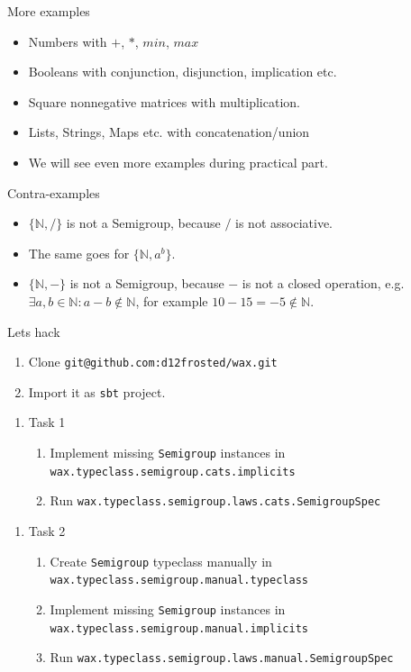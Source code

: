 \documentclass[presentation,aspectratio=169,smaller]{beamer}
\begin{document}
\begin{frame}[label={sec:org49fce23}]{More examples}
\begin{itemize}
\item Numbers with \(+\), \(*\), \(min\), \(max\)
\item Booleans with conjunction, disjunction, implication etc.
\item Square nonnegative matrices with multiplication.
\item Lists, Strings, Maps etc. with concatenation/union
\item We will see even more examples during practical part.
\end{itemize}
\end{frame}

\begin{frame}[label={sec:orge88f533}]{Contra-examples}
\begin{itemize}
\item \(\{\mathbb{N}, /\}\) is not a Semigroup, because \(/\) is not associative.
\item The same goes for \(\{\mathbb{N}, a^b \}\).
\item \(\{\mathbb{N}, -\}\) is not a Semigroup, because \(-\) is not a closed operation,
e.g. \(\exists a, b \in \mathbb{N}: a - b \notin \mathbb{N}\),
for example \(10 - 15 = -5 \notin \mathbb{N}\).
\end{itemize}
\end{frame}

\begin{frame}[label={sec:orga20b39a},fragile]{Lets hack}
 \begin{enumerate}
\item Clone \texttt{git@github.com:d12frosted/wax.git}
\item Import it as \texttt{sbt} project.
\end{enumerate}
\pause
\begin{enumerate}
\item Task 1
\begin{enumerate}
\item Implement missing \texttt{Semigroup} instances in
\texttt{wax.typeclass.semigroup.cats.implicits}
\item Run \texttt{wax.typeclass.semigroup.laws.cats.SemigroupSpec}
\end{enumerate}
\end{enumerate}
\pause
\begin{enumerate}
\item Task 2
\begin{enumerate}
\item Create \texttt{Semigroup} typeclass manually in
\texttt{wax.typeclass.semigroup.manual.typeclass}
\item Implement missing \texttt{Semigroup} instances in
\texttt{wax.typeclass.semigroup.manual.implicits}
\item Run \texttt{wax.typeclass.semigroup.laws.manual.SemigroupSpec}
\end{enumerate}
\end{enumerate}
\end{frame}
\end{document}
